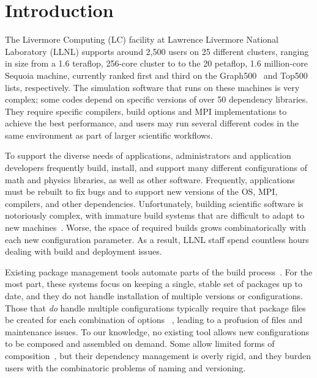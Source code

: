 
\section{Introduction}
\label{sec:intro}

The Livermore Computing (LC) facility at Lawrence Livermore National Laboratory
(LLNL) supports around 2,500 users on 25 different clusters, ranging 
in size from a 1.6 teraflop, 256-core cluster to to the
20 petaflop, 1.6 million-core Sequoia machine, currently ranked first and
third on the Graph500~\cite{graph500} and Top500~\cite{top500}
lists, respectively.
%
%
The simulation software that runs on these machines is very complex; some
codes depend on specific versions of over 50 dependency libraries.
They require specific compilers, build options and MPI implementations to
achieve the best performance, and users may run several
different codes in the same environment as part of larger 
scientific workflows.

To support the diverse needs of applications, administrators and application
developers 
frequently build, install, and support many different configurations
of math and physics libraries, as well as other software.
Frequently, applications must be rebuilt to fix bugs and to support
new versions of the OS, MPI, compilers, and other dependencies.
Unfortunately, building scientific software is notoriously complex, with
immature build systems that are difficult to adapt to new
machines~\cite{dubois+:comp-sci-eng,hoste+:pyhpc12,wilson+:corr}.
Worse, the space of required builds grows combinatorically
with each new configuration parameter. As a result, LLNL staff
spend countless hours dealing with build and deployment issues.

Existing package management tools automate parts of the build 
process~\cite{bsdports,digirolamo:smithy,dolstra+:icfp08,dolstra+:lisa04,hashdist,homebrew,hoste+:pyhpc12,macports,thiruvathukal:gentoo04}.
For the most part, these systems focus on keeping a single, stable set of 
packages up to date, and they do not handle installation of multiple
versions or configurations.  Those that {\it do} handle multiple configurations
typically require that package files be created for each combination of 
options~ \cite{digirolamo:smithy,dolstra+:icfp08,dolstra+:lisa04,hashdist,hoste+:pyhpc12}, 
leading to a profusion of files and maintenance issues.
To our knowledge, no existing tool allows new configurations to be composed
and assembled on demand.  Some allow limited forms of 
composition~\cite{hoste+:pyhpc12,dolstra+:icfp08,dolstra+:lisa04}, but their
dependency management is overly rigid, and they burden users with
the combinatoric problems of naming and versioning.

